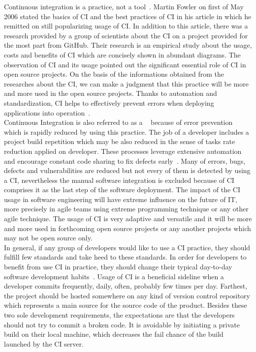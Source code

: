 Continuous integration is a practice, not a tool~\cite{CollabNet}. Martin Fowler on first of May 2006 stated the basics of CI and the best practices of CI in his article in which he remitted on still popularizing usage of CI. In addition to this article, there was a research provided by a group of scientists about the CI on a project provided for the most part from GitHub. Their research is an empirical study about the usage, costs and benefits of CI which are concisely shown in abundant diagrams. The observation of CI and its usage pointed out the significant essential role of CI in open source projects. On the basis of the informations obtained from the researches about the CI, we can make a judgment that this practice will be more and more used in the open source projects. Thanks to automation and standardization, CI helps to effectively prevent errors when deploying applications into operation~\cite{CIcure}.\\

Continuous Integration is also referred to as a ~\cite{CIcure} because of error prevention which is rapidly reduced by using this practice. The job of a developer includes a project build repetition which may be also reduced in the sense of tasks rate reduction applied on developer. These processes leverage extensive automation and encourage constant code sharing to fix defects early~\cite{DigitalOceanCI}. Many of errors, bugs, defects and vulnerabilities are reduced but not every of them is detected by using a CI, nevertheless the manual software integration is excluded because of CI comprises it as the last step of the software deployment. The impact of the CI usage in software engineering will have extreme influence on the future of IT, more precisely in agile teams using extreme programming technique or any other agile technique. The usage of CI is very adaptive and versatile and it will be more and more used in forthcoming open source projects or any another projects which may not be open source only.\\

In general, if any group of developers would like to use a CI practice, they should fulfill few standards and take heed to these standards. In order for developers to benefit from use CI in practice, they should change their typical day-to-day software development habits~\cite{CIQualityFramework}. Usage of CI is a beneficial sideline when a developer commits frequently, daily, often, probably few times per day. Farthest, the project should be hosted somewhere on any kind of version control repository which represents a main source for the source code of the product. Besides these two sole development requirements, the expectations are that the developers should not try to commit a broken code. It is avoidable by initiating a private build on their local machine, which decreases the fail chance of the build launched by the CI server.\\

